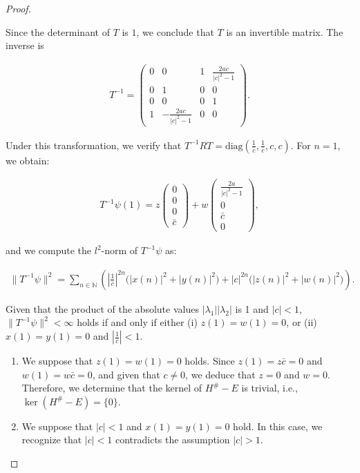 \documentclass{amsart}
\theoremstyle{definition}
\theoremstyle{remark}
\begin{document}
\begin{proof}
\begin{enumerate}
    Since the determinant of \(T\) is $1$, we conclude that \(T\) is an invertible matrix. The inverse is

    \begin{align*}
    T^{-1} = \begin{pmatrix}
    0 & 0 & 1 & \frac{2a c}{|c|^2 - 1} \\
    0 & 1 & 0 & 0 \\
    0 & 0 & 0 & 1 \\
    1 & -\frac{2a c}{|c|^2 - 1} & 0 & 0
    \end{pmatrix}.
    \end{align*}

    Under this transformation, we verify that \(T^{-1} R T = \text{diag}\left( \frac{1}{\bar{c}}, \frac{1}{\bar{c}}, c, c \right)\). For \(n = 1\), we obtain:

    \begin{align*}
    T^{-1} \psi(1) = z \begin{pmatrix} 0 \\ 0 \\ 0 \\ \bar{c} \end{pmatrix} + w \begin{pmatrix} \frac{2a}{|c|^2 - 1} \\ 0 \\ \bar{c} \\ 0 \end{pmatrix},
    \end{align*}

    and we compute the \(l^2\)-norm of \(T^{-1} \psi\) as:

    \begin{align*}
    \| T^{-1} \psi \|^2 = \sum_{n \in \mathbb{N}} \left( \left| \frac{1}{\bar{c}} \right|^{2n} \big( |x(n)|^2 + |y(n)|^2 \big) + |c|^{2n} \big( |z(n)|^2 + |w(n)|^2 \big) \right).
    \end{align*}

   Given that the product of the absolute values \(|\lambda_1| |\lambda_2|\) is 1 and \(|c| < 1\), \(\| T^{-1} \psi \|^2 < \infty\) holds if and only if either (i) \(z(1) = w(1) = 0\), or (ii) \(x(1) = y(1) = 0\) and \(\left| \frac{1}{\bar{c}} \right| < 1\).

    \begin{enumerate}
        \item We suppose that \(z(1) = w(1) = 0\) holds. Since \(z(1) = z \bar{c} = 0\) and \(w(1) = w \bar{c} = 0\), and given that \(c \neq 0\), we deduce that \(z = 0\) and \(w = 0\). Therefore, we determine that the kernel of \(H^\# - E\) is trivial, i.e., \(\ker(H^\# - E) = \{0\}\).

        \item We suppose that \(|c| < 1\) and \(x(1) = y(1) = 0\) hold. In this case, we recognize that \(|c| < 1\) contradicts the assumption \(|c| > 1\).
    \end{enumerate}
\end{enumerate}
  \end{proof}
\end{document}

